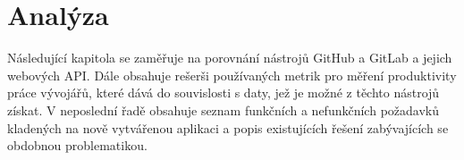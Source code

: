 \chapter{Analýza}
Následující kapitola se zaměřuje na porovnání nástrojů GitHub a GitLab a jejich webových API. Dále obsahuje rešerši používaných metrik pro měření produktivity práce vývojářů, které dává do souvislosti s daty, jež je možné z těchto nástrojů získat. V neposlední řadě obsahuje seznam funkčních a nefunkčních požadavků kladených na nově vytvářenou aplikaci a popis existujících řešení zabývajících se obdobnou problematikou.






